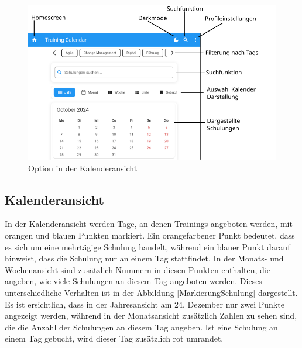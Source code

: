   \begin{figure}[htbp!]
    \centering
    \includegraphics[scale=0.7]{img/Flutter_Optionen.png}
    \caption{Option in der Kalenderansicht}
    \label{OptionenBE}
\end{figure}

\subsection{Kalenderansicht}
In der Kalenderansicht werden Tage, an denen Trainings angeboten werden, mit orangen und blauen Punkten markiert. Ein orangefarbener
Punkt bedeutet, dass es sich um eine mehrtägige Schulung handelt, während ein blauer Punkt darauf hinweist, dass die Schulung nur
an einem Tag stattfindet. In der Monats- und Wochenansicht sind zusätzlich Nummern in diesen Punkten enthalten, die angeben, wie
viele Schulungen an diesem Tag angeboten werden. Dieses unterschiedliche Verhalten ist in der Abbildung \ref{MarkierungSchulung}
dargestellt. Es ist ersichtlich, dass in der Jahresansicht am 24. Dezember nur zwei Punkte angezeigt werden, während in der 
Monatsansicht zusätzlich Zahlen zu sehen sind, die die Anzahl der Schulungen an diesem Tag angeben.
Ist eine Schulung an einem Tag gebucht, wird dieser Tag zusätzlich rot umrandet.

